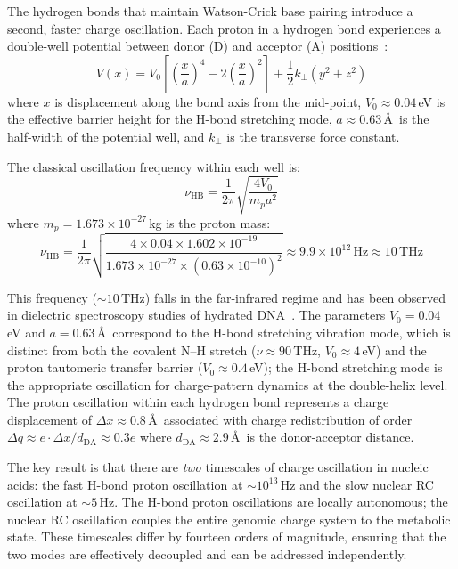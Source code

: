\documentclass[12pt,a4paper]{article}
\theoremstyle{definition}
\theoremstyle{remark}
\begin{document}
The hydrogen bonds that maintain Watson-Crick base pairing introduce a second, faster charge oscillation. Each proton in a hydrogen bond experiences a double-well potential between donor (D) and acceptor (A) positions~\cite{Lowdin1963,Limbach2006}:
\begin{equation}
  V(x) = V_0 \left[\left(\frac{x}{a}\right)^4 - 2\left(\frac{x}{a}\right)^2\right] + \frac{1}{2}k_\perp(y^2 + z^2)
  \label{eq:double_well}
\end{equation}
where $x$ is displacement along the bond axis from the mid-point, $V_0 \approx 0.04$\,eV is the effective barrier height for the H-bond stretching mode, $a \approx 0.63$\,\AA\ is the half-width of the potential well, and $k_\perp$ is the transverse force constant.

The classical oscillation frequency within each well is:
\begin{equation}
  \nu_{\mathrm{HB}} = \frac{1}{2\pi}\sqrt{\frac{4V_0}{m_p a^2}}
  \label{eq:hbond_freq}
\end{equation}
where $m_p = 1.673 \times 10^{-27}$\,kg is the proton mass:
\begin{equation}
  \nu_{\mathrm{HB}} = \frac{1}{2\pi}\sqrt{\frac{4 \times 0.04 \times 1.602 \times 10^{-19}}{1.673 \times 10^{-27} \times (0.63 \times 10^{-10})^2}} \approx 9.9 \times 10^{12}\,\mathrm{Hz} \approx 10\,\mathrm{THz}
  \label{eq:hbond_freq_numerical}
\end{equation}

This frequency ($\sim\!10$\,THz) falls in the far-infrared regime and has been observed in dielectric spectroscopy studies of hydrated DNA~\cite{Weidlich1990,Woolard2002}. The parameters $V_0 = 0.04$\,eV and $a = 0.63$\,\AA\ correspond to the H-bond stretching vibration mode, which is distinct from both the covalent N--H stretch ($\nu \approx 90$\,THz, $V_0 \approx 4$\,eV) and the proton tautomeric transfer barrier ($V_0 \approx 0.4$\,eV); the H-bond stretching mode is the appropriate oscillation for charge-pattern dynamics at the double-helix level. The proton oscillation within each hydrogen bond represents a charge displacement of $\Delta x \approx 0.8$\,\AA\ associated with charge redistribution of order $\Delta q \approx e \cdot \Delta x / d_{\mathrm{DA}} \approx 0.3e$ where $d_{\mathrm{DA}} \approx 2.9$\,\AA\ is the donor-acceptor distance.

The key result is that there are \emph{two} timescales of charge oscillation in nucleic acids: the fast H-bond proton oscillation at $\sim\!10^{13}$\,Hz and the slow nuclear RC oscillation at $\sim\!5$\,Hz. The H-bond proton oscillations are locally autonomous; the nuclear RC oscillation couples the entire genomic charge system to the metabolic state. These timescales differ by fourteen orders of magnitude, ensuring that the two modes are effectively decoupled and can be addressed independently.
\end{document}

